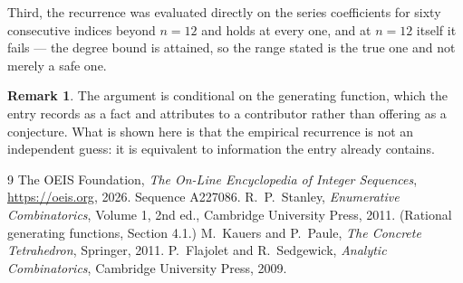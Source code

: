 \documentclass[11pt,a4paper]{article}
\theoremstyle{plain}
\theoremstyle{definition}
\newtheorem{remark}[theorem]{Remark}
\begin{document}
Third, the recurrence was evaluated directly on the series coefficients for sixty consecutive
indices beyond $n=12$ and holds at every one, and at $n=12$ itself it fails --- the
degree bound is attained, so the range stated is the true one and not merely a safe one.

\begin{remark}
The argument is conditional on the generating function, which the entry records as a fact and
attributes to a contributor rather than offering as a conjecture. What is shown here is that
the empirical recurrence is not an independent guess: it is equivalent to information the
entry already contains.
\end{remark}

\begin{thebibliography}{9}
 The OEIS Foundation, \emph{The On-Line Encyclopedia of Integer
Sequences}, \url{https://oeis.org}, 2026. Sequence A227086.
 R.~P.~Stanley, \emph{Enumerative Combinatorics}, Volume 1, 2nd ed.,
Cambridge University Press, 2011. (Rational generating functions, Section 4.1.)
 M.~Kauers and P.~Paule, \emph{The Concrete Tetrahedron}, Springer, 2011.
 P.~Flajolet and R.~Sedgewick, \emph{Analytic Combinatorics}, Cambridge
University Press, 2009.
\end{thebibliography}
\end{document}
